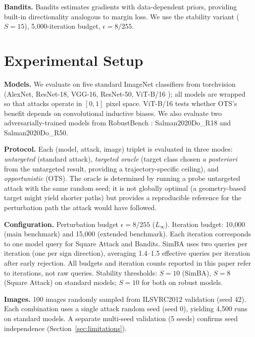 \documentclass{cap2026}
\begin{document}
\textbf{Bandits.} Bandits \citep{ilyas2019prior} estimates gradients with data-dependent priors, providing built-in directionality analogous to margin loss. We use the stability variant ($S = 15$), 5,000-iteration budget, $\epsilon = 8/255$.

\section{Experimental Setup}\label{sec:setup}

\hspace{\parindent}\textbf{Models.} We evaluate on five standard ImageNet classifiers from torchvision (AlexNet, ResNet-18, VGG-16, ResNet-50, ViT-B/16 \citep{dosovitskiy2021image}); all models are wrapped so that attacks operate in $[0, 1]$ pixel space. ViT-B/16 tests whether OTS's benefit depends on convolutional inductive biases. We also evaluate two adversarially-trained models from RobustBench \citep{salman2020adversarially,croce2021robustbench}: Salman2020Do\_R18 and Salman2020Do\_R50.

\textbf{Protocol.} Each (model, attack, image) triplet is evaluated in three modes: \textit{untargeted} (standard attack), \textit{targeted oracle} (target class chosen \textit{a posteriori} from the untargeted result, providing a trajectory-specific ceiling), and \textit{opportunistic} (OTS). The oracle is determined by running a probe untargeted attack with the same random seed; it is not globally optimal (a geometry-based target might yield shorter paths) but provides a reproducible reference for the perturbation path the attack would have followed.

\textbf{Configuration.} Perturbation budget $\epsilon = 8/255$ ($L_\infty$). Iteration budget: 10,000 (main benchmark) and 15,000 (extended benchmark). Each iteration corresponds to one model query for Square Attack and Bandits. SimBA uses two queries per iteration (one per sign direction), averaging 1.4--1.5 effective queries per iteration after early rejection. All budgets and iteration counts reported in this paper refer to iterations, not raw queries. Stability thresholds: $S = 10$ (SimBA), $S = 8$ (Square Attack) on standard models; $S = 10$ for both on robust models.

\textbf{Images.} 100 images randomly sampled from ILSVRC2012 validation (seed 42). Each combination uses a single attack random seed (seed 0), yielding 4,500 runs on standard models. A separate multi-seed validation (5 seeds) confirms seed independence (Section~\ref{sec:limitations}).
\end{document}
